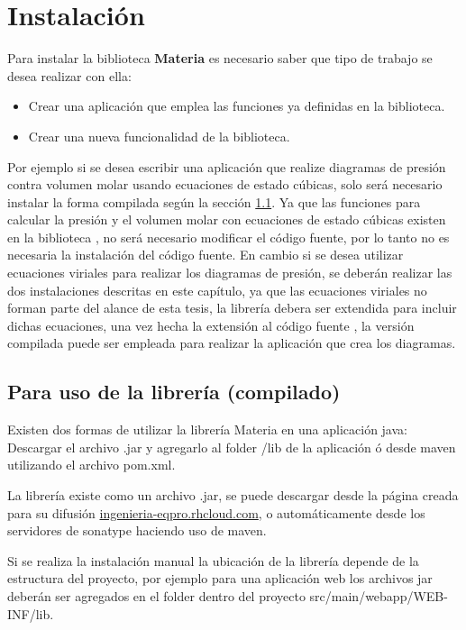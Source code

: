 \chapter{Instalación}

  Para instalar la biblioteca \textbf{Materia} es necesario saber que tipo de trabajo se desea realizar con ella:
  \begin{itemize}
    \item Crear una aplicación que emplea las funciones ya definidas en la biblioteca.
    \item Crear una nueva funcionalidad de la biblioteca.
  \end{itemize}

  Por ejemplo si se desea escribir una aplicación que realize diagramas de presión contra volumen molar usando ecuaciones de estado cúbicas, solo será necesario instalar la forma compilada según la sección \ref{sec:compiledinstall}. Ya que las funciones para calcular la presión y el volumen molar con ecuaciones de estado cúbicas existen en la biblioteca , no será necesario modificar el código fuente, por lo tanto no es necesaria la instalación del código fuente. En cambio si se desea utilizar ecuaciones viriales para realizar los diagramas de presión, se deberán realizar las dos instalaciones descritas en este capítulo, ya que las ecuaciones viriales no forman parte del alance de esta tesis, la librería debera ser extendida para incluir dichas ecuaciones, una vez hecha la extensión al código fuente , la versión compilada puede ser empleada para realizar la aplicación que crea los diagramas.


  \section{Para uso de la librería (compilado)}\label{sec:compiledinstall}

      Existen dos formas de utilizar la librería Materia en una aplicación java:
    Descargar el archivo .jar y agregarlo al folder /lib de la aplicación ó desde maven utilizando el archivo pom.xml.

    La librería existe como un archivo .jar, se puede descargar desde la página creada para su difusión \url{ingenieria-eqpro.rhcloud.com}, o automáticamente desde los servidores de sonatype haciendo uso de maven.

    Si se realiza la instalación manual la ubicación de la librería depende de la estructura del proyecto, por ejemplo para una aplicación web los archivos jar deberán ser agregados en el folder dentro del proyecto src/main/webapp/WEB-INF/lib.

